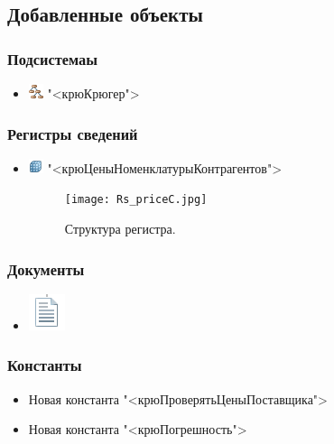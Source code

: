 \subsection{Добавленные объекты}
\subsubsection{Подсистемаы}
\begin{itemize}	
    \item \includegraphics[width=0.02\linewidth]{images/ps}
     "<крюКрюгер">
\end{itemize}
\subsubsection{Регистры сведений}
\begin{itemize}\item 	\includegraphics[width=0.02\linewidth]{images/rs}
    "<крюЦеныНоменклатурыКонтрагентов">
    \begin{figure}[h]
    	\texttt{[image: Rs\_priceC.jpg]}
    	\caption{Структура регистра.}
    	\label{ris:Rs_priceC.jpg}
    \end{figure}
    
%
\end{itemize}

\subsubsection{Документы}
\begin{itemize}	
    \item \includegraphics[width=0.02\linewidth]{images/doc}

	
\end{itemize}

\subsubsection{Константы}
\begin{itemize}	
	\item Новая константа "<крюПроверятьЦеныПоставщика">	
	\item Новая константа "<крюПогрешность">	
		
\end{itemize}


